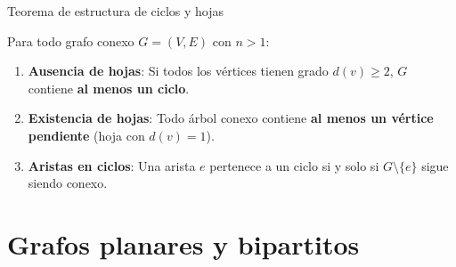 \documentclass[
  ignorenonframetext,
]{beamer}
\providecommand{\tightlist}{%
  \setlength{\itemsep}{0pt}\setlength{\parskip}{0pt}}
\begin{document}
\begin{frame}{Teorema de estructura de ciclos y hojas}
\label{teorema-de-estructura-de-ciclos-y-hojas}
\begin{tcolorbox}[enhanced jigsaw, left=2mm, opacityback=0, titlerule=0mm, breakable, toptitle=1mm, rightrule=.15mm, bottomtitle=1mm, coltitle=black, title=\textcolor{quarto-callout-important-color}{\faExclamation}\hspace{0.5em}{Propiedades estructurales}, colframe=quarto-callout-important-color-frame, colbacktitle=quarto-callout-important-color!10!white, arc=.35mm, toprule=.15mm, leftrule=.75mm, bottomrule=.15mm, opacitybacktitle=0.6, colback=white]

Para todo grafo conexo \(G = (V, E)\) con \(n > 1\):

\begin{enumerate}
\tightlist
\item
  \textbf{Ausencia de hojas}: Si todos los vértices tienen grado
  \(d(v) \ge 2\), \(G\) contiene \textbf{al menos un ciclo}.
\item
  \textbf{Existencia de hojas}: Todo árbol conexo contiene \textbf{al
  menos un vértice pendiente} (hoja con \(d(v) = 1\)).
\item
  \textbf{Aristas en ciclos}: Una arista \(e\) pertenece a un ciclo si y
  solo si \(G \setminus \{e\}\) sigue siendo conexo.
\end{enumerate}

\end{tcolorbox}
\end{frame}

\section{Grafos planares y
bipartitos}\label{grafos-planares-y-bipartitos}
\end{document}
